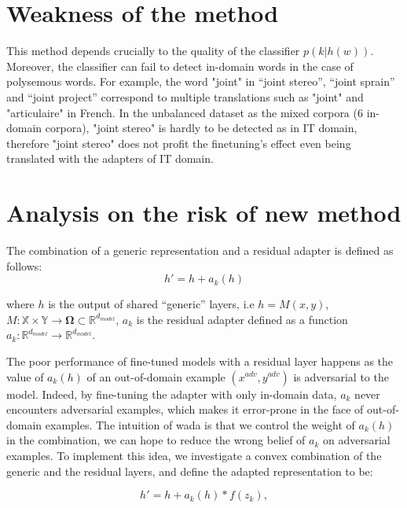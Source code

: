 \documentclass[12pt,a4paper,twoside]{report}
\theoremstyle{definition}
\begin{document}
\section*{Weakness of the method}

This method depends crucially to the quality of the classifier $p(k|h(w))$. Moreover, the classifier can fail to detect in-domain words in the case of polysemous words. For example, the word "joint" in ``joint stereo'', ``joint sprain'' and ``joint project'' correspond to multiple translations such as "joint" and "articulaire" in French. In the unbalanced dataset as the mixed corpora (6 in-domain corpora),  "joint stereo" is hardly to be detected as in IT domain, therefore "joint stereo" does not profit the finetuning's effect even being translated with the adapters of IT domain.

\section*{Analysis on the risk of new method}

The combination of a generic representation and a residual adapter is defined as follows:
\begin{equation}
  h' = h + a_k(h) \label{eq:residual-adapter}
\end{equation}

where $h$ is the output of shared ``generic'' layers, i.e $h=M(x,y)$, $M: \mathbb{X} \times \mathbb{Y} \rightarrow \mathbf{\Omega}\subset \mathbb{R}^{d_{model}}$, $a_k$ is the residual adapter defined as a function $a_k: \mathbb{R}^{d_{model}} \rightarrow \mathbb{R}^{d_{model}}$.

The poor performance of fine-tuned models with a residual layer happens as the value of $a_k(h)$ of an out-of-domain example $(x^{adv}, y^{adv})$ is adversarial to the model. Indeed, by fine-tuning the adapter with only in-domain data, $a_k$ never encounters adversarial examples, which makes it error-prone in the face of out-of-domain examples. The intuition of wada is that we control the weight of $a_k(h)$ in the combination, we can hope to reduce the wrong belief of $a_k$ on adversarial examples. To implement this idea, we  investigate a convex combination of the generic and the residual layers, and define the adapted representation to be:

\begin{equation}
h' = h + a_k(h) * f(z_k), 
\label{eq:2}
\end{equation}
\end{document}
